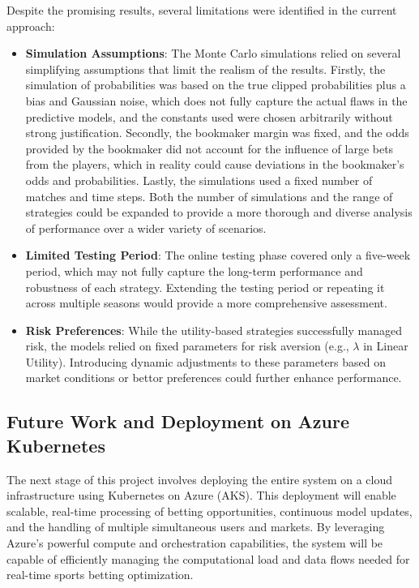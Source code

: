 Despite the promising results, several limitations were identified in the current approach:

\begin{itemize}
    \item \textbf{Simulation Assumptions}: The Monte Carlo simulations relied on several simplifying assumptions that limit the realism of the results. Firstly, the simulation of probabilities was based on the true clipped probabilities plus a bias and Gaussian noise, which does not fully capture the actual flaws in the predictive models, and the constants used were chosen arbitrarily without strong justification. Secondly, the bookmaker margin was fixed, and the odds provided by the bookmaker did not account for the influence of large bets from the players, which in reality could cause deviations in the bookmaker’s odds and probabilities. Lastly, the simulations used a fixed number of matches and time steps. Both the number of simulations and the range of strategies could be expanded to provide a more thorough and diverse analysis of performance over a wider variety of scenarios.
    \item \textbf{Limited Testing Period}: The online testing phase covered only a five-week period, which may not fully capture the long-term performance and robustness of each strategy. Extending the testing period or repeating it across multiple seasons would provide a more comprehensive assessment.
    \item \textbf{Risk Preferences}: While the utility-based strategies successfully managed risk, the models relied on fixed parameters for risk aversion (e.g., \( \lambda \) in Linear Utility). Introducing dynamic adjustments to these parameters based on market conditions or bettor preferences could further enhance performance.
\end{itemize}

\subsection{Future Work and Deployment on Azure Kubernetes}

The next stage of this project involves deploying the entire system on a cloud infrastructure using Kubernetes on Azure (AKS). This deployment will enable scalable, real-time processing of betting opportunities, continuous model updates, and the handling of multiple simultaneous users and markets. By leveraging Azure’s powerful compute and orchestration capabilities, the system will be capable of efficiently managing the computational load and data flows needed for real-time sports betting optimization.


